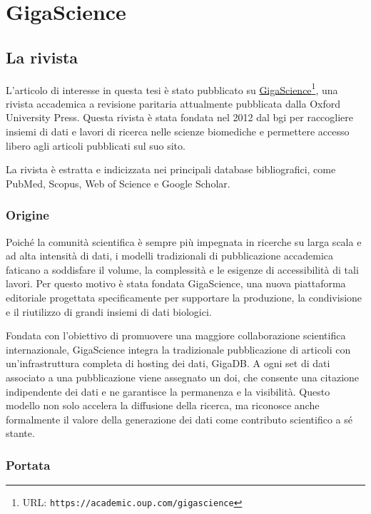 \documentclass[../main.tex]{subfiles}
\begin{document}
\chapter{GigaScience}
\section{La rivista}

L'articolo di interesse in questa tesi è stato pubblicato su \href{https://academic.oup.com/gigascience}{GigaScience}\footnote{URL: \texttt{https://academic.oup.com/gigascience}}, una rivista accademica a revisione paritaria attualmente pubblicata dalla Oxford University Press.\cite{gigaScienceOxford}
Questa rivista è stata fondata nel 2012 dal \acrfull{bgi} per raccogliere insiemi di dati e lavori di ricerca nelle scienze biomediche e permettere accesso libero agli articoli pubblicati sul suo sito.\cite{gigascienceIntro}

La rivista è estratta e indicizzata nei principali database bibliografici, come PubMed, Scopus, Web of Science e Google Scholar.

\subsection{Origine}

Poiché la comunità scientifica è sempre più impegnata in ricerche su larga scala e ad alta intensità di dati, i modelli tradizionali di pubblicazione accademica faticano a soddisfare il volume, la complessità e le esigenze di accessibilità di tali lavori.
Per questo motivo è stata fondata GigaScience, una nuova piattaforma editoriale progettata specificamente per supportare la produzione, la condivisione e il riutilizzo di grandi insiemi di dati biologici.

Fondata con l'obiettivo di promuovere una maggiore collaborazione scientifica internazionale, GigaScience integra la tradizionale pubblicazione di articoli con un'infrastruttura completa di hosting dei dati, GigaDB.\cite{gigadb}
A ogni set di dati associato a una pubblicazione viene assegnato un \acrfull{doi}, che consente una citazione indipendente dei dati e ne garantisce la permanenza e la visibilità.
Questo modello non solo accelera la diffusione della ricerca, ma riconosce anche formalmente il valore della generazione dei dati come contributo scientifico a sé stante.

\subsection{Portata}
\end{document}
